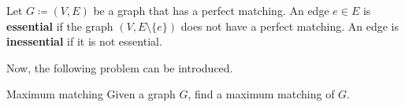 \begin{definition}
\label{def:essential}
    Let \(G \coloneqq (V, E)\) be a graph that has a perfect matching.
    An edge \(e \in E\) is \textbf{essential} if the graph \((V, E \setminus \{e\})\) does not have a perfect matching.
    An edge is \textbf{inessential} if it is not essential.
\end{definition}
\noindent
Now, the following problem can be introduced.
\newpage
\begin{problem}{Maximum matching}
\label{prob:max_matching}
	Given a graph \(G\), find a maximum matching of \(G\).
\end{problem}
